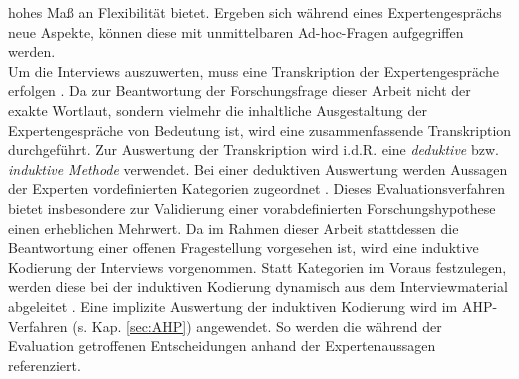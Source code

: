 hohes Maß an Flexibilität bietet. Ergeben sich während eines Expertengesprächs neue Aspekte, können diese mit unmittelbaren Ad-hoc-Fragen aufgegriffen werden.\\ Um die Interviews auszuwerten, muss eine Transkription der Expertengespräche erfolgen \cite[179]{Aghamanoukjan.2009}. Da zur Beantwortung der Forschungsfrage dieser Arbeit nicht der exakte Wortlaut, sondern vielmehr die inhaltliche Ausgestaltung der Expertengespräche von Bedeutung ist, wird eine zusammenfassende Transkription durchgeführt. Zur Auswertung der Transkription wird i.d.R. eine \textit{deduktive} bzw. \textit{induktive Methode} verwendet. Bei einer deduktiven Auswertung werden Aussagen der Experten vordefinierten Kategorien zugeordnet \cite[663]{Aghamanoukjan.2009}. Dieses Evaluationsverfahren bietet insbesondere zur Validierung einer vorabdefinierten Forschungshypothese einen erheblichen Mehrwert. Da im Rahmen dieser Arbeit stattdessen die Beantwortung einer offenen Fragestellung vorgesehen ist, wird eine induktive Kodierung der Interviews vorgenommen. Statt Kategorien im Voraus festzulegen, werden diese bei der induktiven Kodierung dynamisch aus dem Interviewmaterial abgeleitet \cite[663]{Aghamanoukjan.2009}. Eine implizite Auswertung der induktiven Kodierung wird im AHP-Verfahren (s. Kap. \ref{sec:AHP}) angewendet. So werden die während der Evaluation getroffenen Entscheidungen anhand der Expertenaussagen referenziert.

